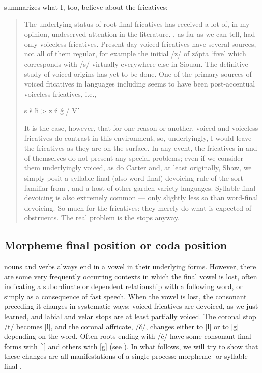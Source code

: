 \documentclass[output=paper]{LSP/langsci}
\begin{document}
\citet[4]{Rankin2001} summarizes what I, too, believe about the fricatives:

\begin{quote}The underlying status of  root-final fricatives has received a lot of, in my opinion, undeserved attention in the literature. , as far as we can tell, had only voiceless fricatives. Present-day voiced fricatives have several sources, not all of them regular, for example the initial /z/ of z\'apta `five' which corresponds with /s/ virtually everywhere else in Siouan. The definitive study of voiced  origins has yet to be done. One of the primary sources of voiced fricatives in  languages including  seems to have been post-accentual voiceless fricatives, i.e.,\vspace{-1em}
\begin{center}
s \v{s} \v{h} > z \v{z} \v{g} / V$'$  \underline{\hspace{1em}}
\end{center}
\vspace{-1em}
It is the case, however, that for one reason or another, voiced and voiceless fricatives do contrast in this environment, so, underlyingly, I would leave the fricatives as they are on the surface. In any event, the fricatives in and of themselves do not present any special problems; even if we consider them underlyingly voiced, as do Carter and, at least originally, Shaw, we simply posit a syllable-final (also word-final) devoicing rule of the sort familiar from ,  and a host of other garden variety languages. Syllable-final devoicing is also extremely common --- only slightly less so than word-final devoicing. So much for the fricatives: they merely do what is expected of obstruents. The real problem is the stops anyway.\end{quote}

\subsection{Morpheme final position or coda position}

 nouns and verbs always end in a vowel in their underlying forms. However, there are some very frequently occurring contexts in which the final vowel is lost, often indicating a subordinate or dependent relationship with a following word, or simply as a consequence of fast speech. When the vowel is lost, the consonant preceding it changes in systematic ways: voiced fricatives are devoiced, as we just learned, and labial and velar stops are at least partially voiced. The coronal stop /t/ becomes [l], and the coronal affricate, /\v{c}/, changes either to [l] or to [g] depending on the word. Often roots ending with /\v{c}/ have some consonant final forms with [l] and others with [g] (see ). In what follows, we will try to show that these changes are all manifestations of a single process: morpheme- or syllable-final .
\end{document}
